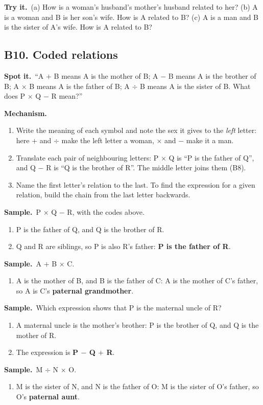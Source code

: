 \documentclass[11pt,a4paper]{article}
\let\oldsubsection\subsection
\renewcommand{\subsection}{\needspace{9\baselineskip}\oldsubsection}
\newcommand{\spot}{\textbf{\color{ember}Spot it.}\ }
\newcommand{\mech}{\textbf{\color{ember}Mechanism.}\ }
\newif\ifkeepsamp
\newcommand{\samp}{\ifkeepsamp\needspace{4\baselineskip}\fi\textbf{\color{ember}Sample.}\ }
\newcommand{\tryit}[1]{\textbf{\color{ember}Try it.}\ #1}
\begin{document}
\tryit (a) How is a woman's husband's mother's husband related to her? (b) A is a woman and B is her son's wife. How is A related to B? (c) A is a man and B is the sister of A's wife. How is A related to B?

\subsection{B10. Coded relations}
\spot ``A $+$ B means A is the mother of B; A $-$ B means A is the brother of B; A $\times$ B means A is the father of B; A $\div$ B means A is the sister of B. What does P $\times$ Q $-$ R mean?''

\mech
\begin{enumerate}
\item Write the meaning of each symbol and note the sex it gives to the \emph{left} letter: here $+$ and $\div$ make the left letter a woman, $\times$ and $-$ make it a man.
\item Translate each pair of neighbouring letters: P $\times$ Q is ``P is the father of Q'', and Q $-$ R is ``Q is the brother of R''. The middle letter joins them (B8).
\item Name the first letter's relation to the last. To find the expression for a given relation, build the chain from the last letter backwards.
\end{enumerate}

\samp P $\times$ Q $-$ R, with the codes above.
\begin{enumerate}
\item P is the father of Q, and Q is the brother of R.
\item Q and R are siblings, so P is also R's father: \textbf{P is the father of R}.
\end{enumerate}
\samp A $+$ B $\times$ C.
\begin{enumerate}
\item A is the mother of B, and B is the father of C: A is the mother of C's father, so A is C's \textbf{paternal grandmother}.
\end{enumerate}
\samp Which expression shows that P is the maternal uncle of R?
\begin{enumerate}
\item A maternal uncle is the mother's brother: P is the brother of Q, and Q is the mother of R.
\item The expression is \textbf{P $-$ Q $+$ R}.
\end{enumerate}
\samp M $\div$ N $\times$ O.
\begin{enumerate}
\item M is the sister of N, and N is the father of O: M is the sister of O's father, so O's \textbf{paternal aunt}.
\end{enumerate}
\end{document}
